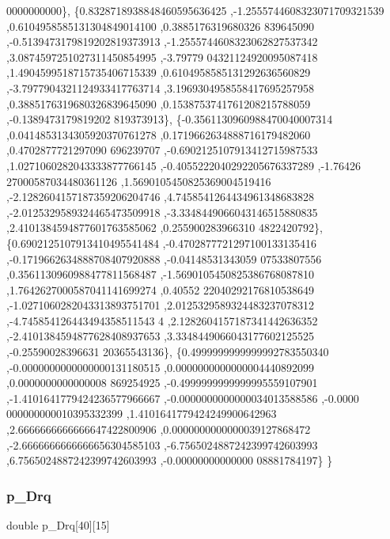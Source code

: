 \begin{DoxyCode}
      0000000000\},
\{0.8328718938848460595636425 ,-1.2555744608323071709321539 ,0.6104958585131304849014100 ,0.3885176319680326
      839645090 ,-0.5139473179819202819373913 ,-1.2555744608323062827537342 ,3.0874597251027311450854995 ,-3.79779
      04321124920095087418 ,1.4904599518715735406715339 ,0.6104958585131292636560829 ,-3.7977904321124933417763714
       ,3.1969304958558417695257958 ,0.3885176319680326839645090 ,0.1538753741761208215788059 ,-0.1389473179819202
      819373913\},
\{-0.3561130960988470040007314 ,0.0414853134305920370761278 ,0.1719662634888716179482060 ,0.4702877721297090
      696239707 ,-0.6902125107913412715987533 ,1.0271060282043333877766145 ,-0.4055222040292205676337289 ,-1.76426
      27000587034480361126 ,1.5690105450825369004519416 ,-2.1282604157187359206204746 ,4.7458541264434961348683828
       ,-2.0125329589324465473509918 ,-3.3348449066043146515880835 ,2.4101384594877601763585062 ,0.255900283966310
      4822420792\},
\{0.6902125107913410495541484 ,-0.4702877721297100133135416 ,-0.1719662634888708407920888 ,-0.04148531343059
      07533807556 ,0.3561130960988477811568487 ,-1.5690105450825386768087810 ,1.7642627000587041141699274 ,0.40552
      22040292176810538649 ,-1.0271060282043313893751701 ,2.0125329589324483237078312 ,-4.745854126443494358511543
      4 ,2.1282604157187341442636352 ,-2.4101384594877628408937653 ,3.3348449066043177602125525 ,-0.25590028396631
      20365543136\},
\{0.4999999999999992783550340 ,-0.0000000000000000131180515 ,0.0000000000000004440892099 ,0.0000000000000008
      869254925 ,-0.4999999999999995559107901 ,-1.4101641779424236577966667 ,-0.0000000000000034013588586 ,-0.0000
      000000000010395332399 ,1.4101641779424249900642963 ,2.6666666666666647422800906 ,0.0000000000000039127868472
       ,-2.6666666666666656304585103 ,-6.7565024887242399742603993 ,6.7565024887242399742603993 ,-0.00000000000000
      08881784197\}
\}
\end{DoxyCode}
\mbox{\label{a00455_a919beda2d6175fe77c724b563af9b8c6}} 
\subsubsection{\texorpdfstring{p\+\_\+\+Drq}{p\_Drq}}
{\footnotesize\ttfamily double p\+\_\+\+Drq\mbox{[}40\mbox{]}\mbox{[}15\mbox{]}}

